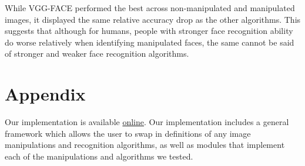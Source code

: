\documentclass[pageno]{cos429}
\begin{document}
While VGG-FACE performed the best across non-manipulated and manipulated images, it displayed the same relative accuracy drop as the other algorithms. This suggests that although for humans, people with stronger face recognition ability do worse relatively when identifying manipulated faces, the same cannot be said of stronger and weaker face recognition algorithms.



 
\section{Appendix}\label{sec:Appendix}
Our implementation is available \href{https://github.com/cchen23/COS429_final_project}{online}. Our implementation includes a general framework which allows the user to swap in definitions of any image manipulations and recognition algorithms, as well as modules that implement each of the manipulations and algorithms we tested.
\end{document}
